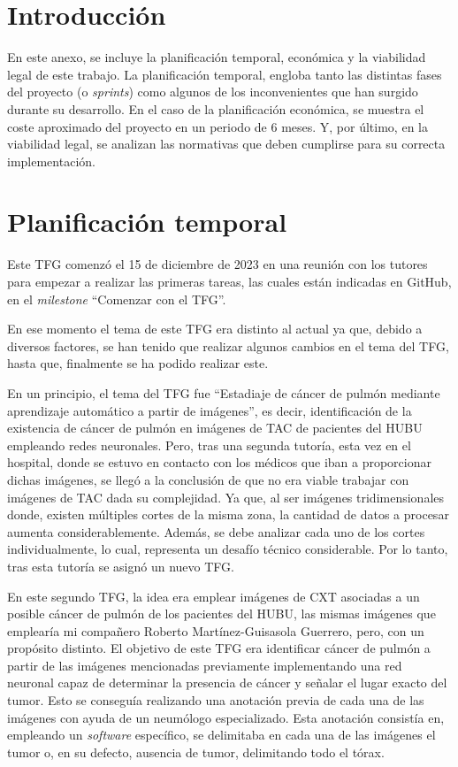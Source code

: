 
\section{Introducción}

En este anexo, se incluye la planificación temporal, económica y la viabilidad legal de este trabajo. La planificación temporal, engloba tanto las distintas fases del proyecto (o \textit{sprints}) como algunos de los inconvenientes que han surgido durante su desarrollo. En el caso de la planificación económica, se muestra el coste aproximado del proyecto en un periodo de 6 meses. Y, por último, en la viabilidad legal, se analizan las normativas que deben cumplirse para su correcta implementación.

\section{Planificación temporal}

Este TFG comenzó el 15 de diciembre de 2023 en una reunión con los tutores para empezar a realizar las primeras tareas, las cuales están indicadas en GitHub, en el \textit{milestone} ``Comenzar con el TFG''.

En ese momento el tema de este TFG era distinto al actual ya que, debido a diversos factores, se han tenido que realizar algunos cambios en el tema del TFG, hasta que, finalmente se ha podido realizar este.

En un principio, el tema del TFG fue ``Estadiaje de cáncer de pulmón mediante aprendizaje automático a partir de imágenes'', es decir, identificación de la existencia de cáncer de pulmón en imágenes de TAC de pacientes del HUBU empleando redes neuronales. Pero, tras una segunda tutoría, esta vez en el hospital, donde se estuvo en contacto con los médicos que iban a proporcionar dichas imágenes, se llegó a la conclusión de que no era viable trabajar con imágenes de TAC dada su complejidad. Ya que, al ser imágenes tridimensionales donde, existen múltiples cortes de la misma zona, la cantidad de datos a procesar aumenta considerablemente. Además, se debe analizar cada uno de los cortes individualmente, lo cual, representa un desafío técnico considerable. Por lo tanto, tras esta tutoría se asignó un nuevo TFG.

En este segundo TFG, la idea era emplear imágenes de CXT asociadas a un posible cáncer de pulmón de los pacientes del HUBU, las mismas imágenes que emplearía mi compañero Roberto Martínez-Guisasola Guerrero, pero, con un propósito distinto. El objetivo de este TFG era identificar cáncer de pulmón a partir de las imágenes mencionadas previamente implementando una red neuronal capaz de determinar la presencia de cáncer y señalar el lugar exacto del tumor. Esto se conseguía realizando una anotación previa de cada una de las imágenes con ayuda de un neumólogo especializado. Esta anotación consistía en, empleando un \textit{software} específico, se delimitaba en cada una de las imágenes el tumor o, en su defecto, ausencia de tumor, delimitando todo el tórax.


